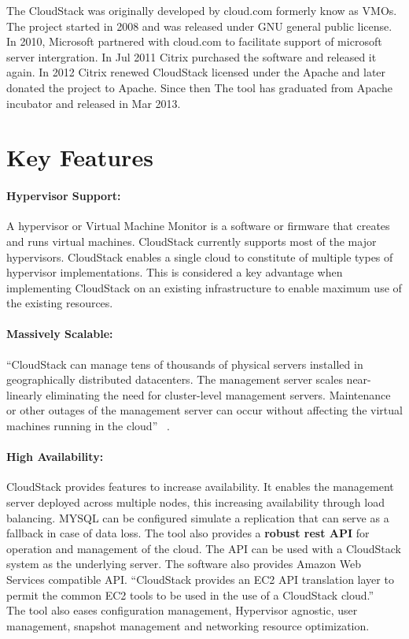 The CloudStack was originally developed by cloud.com formerly know as
VMOs.  The project started in 2008 and was released under GNU general
public license.  In 2010, Microsoft partnered with cloud.com to 
facilitate support of microsoft server intergration. 
In Jul 2011 Citrix purchased the software and
released it again. In 2012 Citrix renewed CloudStack licensed under
the Apache and later donated the project to Apache.  Since then The
tool has graduated from Apache incubator and released in Mar 2013.


\section{Key Features}

\paragraph{Hypervisor Support:} A hypervisor or Virtual Machine
Monitor is a software or firmware that creates and runs virtual
machines. CloudStack currently supports most of the major hypervisors.
CloudStack enables a single cloud to constitute of multiple types of
hypervisor implementations. This is considered a key advantage when
implementing CloudStack on an existing infrastructure to enable
maximum use of the existing resources. 

\paragraph{Massively Scalable:}
``CloudStack can manage tens of thousands of physical servers installed
in geographically distributed datacenters. The management server
scales near-linearly eliminating the need for cluster-level management
servers. Maintenance or other outages of the management server can
occur without affecting the virtual machines running in the cloud''
~\cite{hid-sp18-417-www-cloudstack-scalability}.

\paragraph{High Availability:} CloudStack provides features to
increase availability. It enables the management server deployed
across multiple nodes, this increasing availability through load
balancing. MYSQL can be configured simulate a replication that can
serve as a fallback in case of data loss. The tool also provides a
{\bf robust rest API} for operation and management of the cloud. The
API can be used with a CloudStack system as the underlying server.
The software also provides Amazon Web Services compatible
API. ``CloudStack provides an EC2 API translation layer to permit the
common EC2 tools to be used in the use of a CloudStack
cloud.'' ~\cite{hid-sp18-417-www-cloudstack-aws} The tool also eases
configuration management, Hypervisor agnostic, user management,
snapshot management and networking resource optimization.

